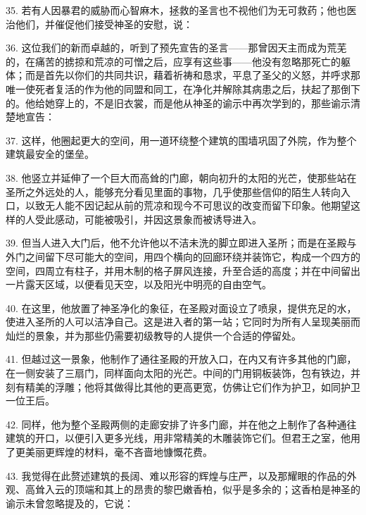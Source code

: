35. 若有人因暴君的威胁而心智麻木，拯救的圣言也不视他们为无可救药；他也医治他们，并催促他们接受神圣的安慰，说： \par

36. 这位我们的新而卓越的，听到了预先宣告的圣言——那曾因天主而成为荒芜的，在痛苦的掳掠和荒凉的可憎之后，应享有这些事——他没有忽略那死亡的躯体；而是首先以你们的共同共识，藉着祈祷和恳求，平息了圣父的义怒，并呼求那唯一使死者复活的作为他的同盟和同工，在净化并解除其病患之后，扶起了那倒下的。他给她穿上的，不是旧衣裳，而是他从神圣的谕示中再次学到的，那些谕示清楚地宣告：\par

37. 这样，他圈起更大的空间，用一道环绕整个建筑的围墙巩固了外院，作为整个建筑最安全的堡垒。\par

38. 他竖立并延伸了一个巨大而高耸的门廊，朝向初升的太阳的光芒，使那些站在圣所之外远处的人，能够充分看见里面的事物，几乎使那些信仰的陌生人转向入口，以致无人能不因记起从前的荒凉和现今不可思议的改变而留下印象。他期望这样的人受此感动，可能被吸引，并因这景象而被诱导进入。\par

39. 但当人进入大门后，他不允许他以不洁未洗的脚立即进入圣所；而是在圣殿与外门之间留下尽可能大的空间，用四个横向的回廊环绕并装饰它，构成一个四方的空间，四周立有柱子，并用木制的格子屏风连接，升至合适的高度；并在中间留出一片露天区域，以便看见天空，以及阳光中明亮的自由空气。\par

40. 在这里，他放置了神圣净化的象征，在圣殿对面设立了喷泉，提供充足的水，使进入圣所的人可以洁净自己。这是进入者的第一站；它同时为所有人呈现美丽而灿烂的景象，并为那些仍需要初级教导的人提供一个合适的停留处。\par

41. 但越过这一景象，他制作了通往圣殿的开放入口，在内又有许多其他的门廊，在一侧安装了三扇门，同样面向太阳的光芒。中间的门用铜板装饰，包有铁边，并刻有精美的浮雕；他将其做得比其他的更高更宽，仿佛让它们作为护卫，如同护卫一位王后。\par

42. 同样，他为整个圣殿两侧的走廊安排了许多门廊，并在他之上制作了各种通往建筑的开口，以便引入更多光线，用非常精美的木雕装饰它们。但君王之室，他用了更美丽更辉煌的材料，毫不吝啬地慷慨花费。\par

43. 我觉得在此赘述建筑的長阔、难以形容的辉煌与庄严，以及那耀眼的作品的外观、高耸入云的顶端和其上的昂贵的黎巴嫩香柏，似乎是多余的；这香柏是神圣的谕示未曾忽略提及的，它说：\par

